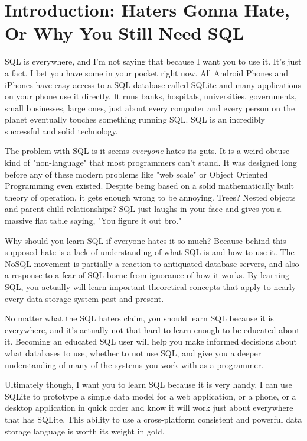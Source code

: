 \chapter*{Introduction: Haters Gonna Hate, Or Why You Still Need SQL}

SQL is everywhere, and I'm not saying that because I want you to use it.  It's
just a fact.  I bet you have some in your pocket right now.  All Android Phones
and iPhones have easy access to a SQL database called SQLite and many
applications on your phone use it directly.  It runs banks, hospitals,
universities, governments, small businesses, large ones, just about every
computer and every person on the planet eventually touches something running
SQL.  SQL is an incredibly successful and solid technology.

The problem with SQL is it seems \emph{everyone} hates its guts.  It is a weird
obtuse kind of "non-language" that most programmers can't stand.  It was
designed long before any of these modern problems like "web scale" or Object
Oriented Programming even existed.  Despite being based on a solid
mathematically built theory of operation, it gets enough wrong to be annoying.
Trees? Nested objects and parent child relationships? SQL just laughs in your
face and gives you a massive flat table saying, "You figure it out bro."

Why should you learn SQL if everyone hates it so much?  Because behind this
supposed hate is a lack of understanding of what SQL is and how to use it.
The NoSQL movement is partially a reaction to antiquated database servers,
and also a response to a fear of SQL borne from ignorance of how it works.
By learning SQL, you actually will learn important theoretical concepts that
apply to nearly every data storage system past and present.

No matter what the SQL haters claim, you should learn SQL because it is
everywhere, and it's actually not that hard to learn enough to be educated
about it.  Becoming an educated SQL user will help you make informed
decisions about what databases to use, whether to not use SQL, and give you
a deeper understanding of many of the systems you work with as a programmer.

Ultimately though, I want you to learn SQL because it is very handy.  I can use
SQLite to prototype a simple data model for a web application, or a phone, or a
desktop application in quick order and know it will work just about everywhere
that has SQLite.  This ability to use a cross-platform consistent and powerful
data storage language is worth its weight in gold.

